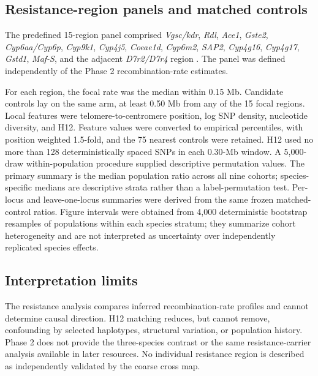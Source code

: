 \subsection*{Resistance-region panels and matched controls}

The predefined 15-region panel comprised \textit{Vgsc/kdr}, \textit{Rdl}, \textit{Ace1}, \textit{Gste2}, \textit{Cyp6aa/Cyp6p}, \textit{Cyp9k1}, \textit{Cyp4j5}, \textit{Coeae1d}, \textit{Cyp6m2}, \textit{SAP2}, \textit{Cyp4g16}, \textit{Cyp4g17}, \textit{Gstd1}, \textit{Maf-S}, and the adjacent \textit{D7r2/D7r4} region \citep{lucas2023resistance,hancock2024surveillance}. The panel was defined independently of the Phase 2 recombination-rate estimates.

For each region, the focal rate was the median within 0.15 Mb. Candidate controls lay on the same arm, at least 0.50 Mb from any of the 15 focal regions. Local features were telomere-to-centromere position, log SNP density, nucleotide diversity, and H12. Feature values were converted to empirical percentiles, with position weighted 1.5-fold, and the 75 nearest controls were retained. H12 used no more than 128 deterministically spaced SNPs in each 0.30-Mb window. A 5,000-draw within-population procedure supplied descriptive permutation values. The primary summary is the median population ratio across all nine cohorts; species-specific medians are descriptive strata rather than a label-permutation test. Per-locus and leave-one-locus summaries were derived from the same frozen matched-control ratios. Figure intervals were obtained from 4,000 deterministic bootstrap resamples of populations within each species stratum; they summarize cohort heterogeneity and are not interpreted as uncertainty over independently replicated species effects.

\subsection*{Interpretation limits}

The resistance analysis compares inferred recombination-rate profiles and cannot determine causal direction. H12 matching reduces, but cannot remove, confounding by selected haplotypes, structural variation, or population history. Phase 2 does not provide the three-species contrast or the same resistance-carrier analysis available in later resources. No individual resistance region is described as independently validated by the coarse cross map.

